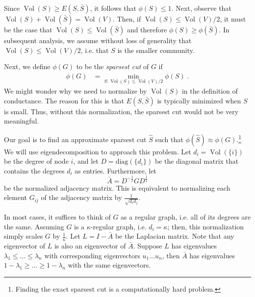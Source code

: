 Since $\operatorname{Vol}(S) \geq E(S, \bar{S})$, it follows that $\phi(S) \leq 1$. Next, observe that $\operatorname{Vol}(S) + \operatorname{Vol}(\bar{S}) = \operatorname{Vol}(V)$. Then, if $\operatorname{Vol}(S) \leq \operatorname{Vol}(V)/2$, it must be the case that $\operatorname{Vol}(S) \leq \operatorname{Vol}(\bar{S})$ and therefore $\phi(S) \geq \phi(\bar{S})$. In subsequent analysis, we assume without loss of generality that $\operatorname{Vol}(S) \leq \operatorname{Vol}(V)/2$, i.e. that $S$ is the smaller community.

Next, we define $\phi(G)$ to be the {\it sparsest cut} of $G$ if
\begin{align}
    \phi(G) &= \min_{S: \operatorname{Vol}(S) \leq \operatorname{Vol}(V)/2} \phi(S) \;.
\end{align}
We might wonder why we need to normalize by $\operatorname{Vol}(S)$ in the definition of conductance. The reason for this is that $E(S, \bar{S})$ is typically minimized when $S$ is small. Thus, without this normalization, the sparsest cut would not be very meaningful.

Our goal is to find an approximate sparsest cut $\hat{S}$ such that $\phi(\hat{S}) \approx \phi(G)$.\footnote{Finding the exact sparsest cut is a computationally hard problem.} We will use eigendecomposition to approach this problem. Let $d_i = \operatorname{Vol}(\{i\})$ be the degree of node $i$, and let $D = \text{diag}(\{d_i\})$ be the diagonal matrix that contains the degrees $d_i$ as entries. Furthermore, let 
\begin{equation}
    \bar{A} = D^{-\frac{1}{2}} G D^{\frac{1}{2}}
\end{equation}
be the normalized adjacency matrix. This is equivalent to normalizing each element $G_{ij}$ of the adjacency matrix by $\frac{1}{\sqrt{d_i d_j}}$.

In most cases, it suffices to think of $G$ as a regular graph, i.e. all of its degrees are the same. Assuming $G$ is a $\kappa$-regular graph, i.e. $d_i = \kappa$; then, this normalization simply scales $G$ by $\frac{1}{\kappa}$. Let $L = I - \bar{A}$ be the Laplacian matrix. Note that any eigenvector of $L$ is also an eigenvector of $\bar{A}$. Suppose $L$ has eigenvalues $\lambda_1 \leq \hdots \leq \lambda_n$ with corresponding eigenvectors $u_1 \hdots u_n$, then $\bar{A}$ has eigenvalues $1 - \lambda_1 \geq \hdots \geq 1 - \lambda_n$ with the same eigenvectors.

